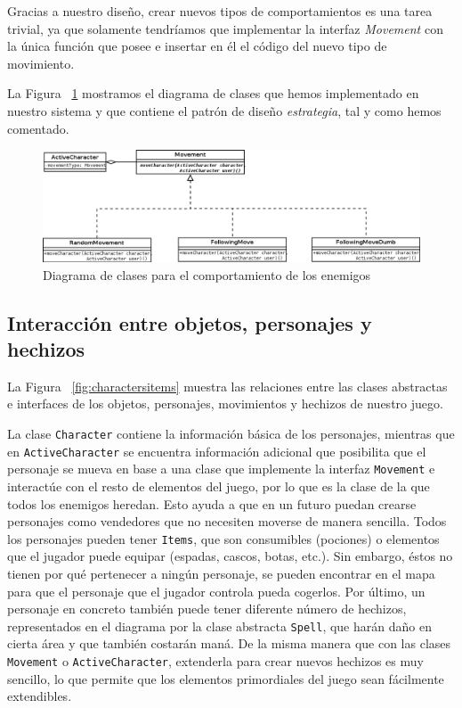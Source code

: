 \noindent Gracias a nuestro diseño, crear nuevos tipos de comportamientos es una tarea trivial, ya que solamente tendríamos que implementar la interfaz \textit{Movement} con la única función que posee e insertar en él el código del nuevo tipo de movimiento.

La Figura ~\ref{fig:iaenemy} mostramos el diagrama de clases que hemos implementado en nuestro sistema y que contiene el patrón de diseño \textit{estrategia}, tal y como hemos comentado.

\begin{figure}
    \includegraphics[width=\textwidth,height=\textheight,keepaspectratio]{./img/iaenemy.png}
  \caption{Diagrama de clases para el comportamiento de los enemigos}
  \label{fig:iaenemy}
\end{figure}

\subsection{Interacción entre objetos, personajes y hechizos}

La Figura ~\ref{fig:charactersitems} muestra las relaciones entre las clases abstractas e interfaces de los objetos, personajes, movimientos y hechizos de nuestro juego.

La clase \texttt{Character} contiene la información básica de los personajes, mientras que en \texttt{ActiveCharacter} se encuentra información adicional que posibilita que el personaje se mueva en base a una clase que implemente la interfaz \texttt{Movement} e interactúe con el resto de elementos del juego, por lo que es la clase de la que todos los enemigos heredan. Esto ayuda a que en un futuro puedan crearse personajes como vendedores que no necesiten moverse de manera sencilla. 
Todos los personajes pueden tener \texttt{Items}, que son consumibles (pociones) o elementos que el jugador puede equipar (espadas, cascos, botas, etc.). Sin embargo, éstos no tienen por qué pertenecer a ningún personaje, se pueden encontrar en el mapa para que el personaje que el jugador controla pueda cogerlos.
Por último, un personaje en concreto también puede tener diferente número de hechizos, representados en el diagrama por la clase abstracta \texttt{Spell}, que harán daño en cierta área y que también costarán maná. De la misma manera que con las clases \texttt{Movement} o \texttt{ActiveCharacter}, extenderla para crear nuevos hechizos es muy sencillo, lo que permite que los elementos primordiales del juego sean fácilmente extendibles.

